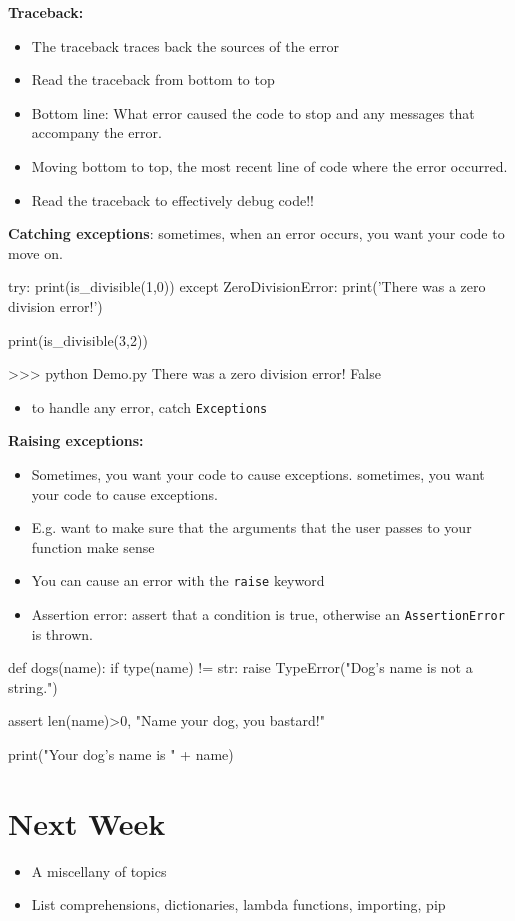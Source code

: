 \documentclass[12pt]{article}
\numberwithin{equation}{section}
\begin{document}
\textbf{Traceback:}
\begin{itemize}
    \item The traceback traces back the sources of the error
    \item Read the traceback from bottom to top
    \item Bottom line: What error caused the code to stop and any messages that accompany the error. 
    \item Moving bottom to top, the most recent line of code where the error occurred.
    \item Read the traceback to effectively debug code!!
\end{itemize}

\textbf{Catching exceptions}: sometimes, when an error occurs, you want your code to move on.
\begin{python}
try:
    print(is_divisible(1,0))
except ZeroDivisionError:
    print('There was a zero division error!')

print(is_divisible(3,2))

>>> python Demo.py
There was a zero division error! 
False
\end{python}
\begin{itemize}
    \item to handle any error, catch \verb|Exceptions|
\end{itemize}

\textbf{Raising exceptions: }
\begin{itemize}
    \item Sometimes, you want your code to cause exceptions.
sometimes, you want your code to cause exceptions.
    \item E.g. want to make sure that the arguments that the user passes to your function make sense
    \item You can cause an error with the \verb|raise| keyword
    \item Assertion error: assert that a condition is true, otherwise an \verb|AssertionError| is thrown.
\end{itemize}
\begin{python}
def dogs(name):
    if type(name) != str:
        raise TypeError("Dog's name is not a string.")
    
    assert len(name)>0, "Name your dog, you bastard!"
    
    print("Your dog's name is " + name)
\end{python}

\section{Next Week}
\begin{itemize}
    \item A miscellany of topics
    \item List comprehensions, dictionaries, lambda functions, importing, pip
\end{itemize}
\end{document}
